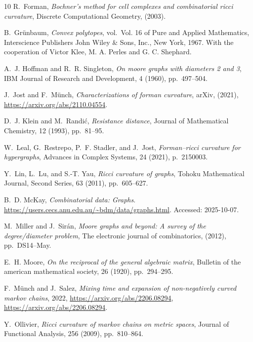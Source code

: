 \documentclass[11pt,a4paper]{amsart}
\begin{document}
\begin{thebibliography}{10}
{\sc R.~Forman}, {\em Bochner's method for cell complexes and combinatorial ricci curvature}, Discrete Computational Geometry,  (2003).

{\sc B.~Gr\"unbaum}, {\em Convex polytopes}, vol.~Vol. 16 of Pure and Applied Mathematics, Interscience Publishers John Wiley \& Sons, Inc., New York, 1967.
\newblock With the cooperation of Victor Klee, M. A. Perles and G. C. Shephard.

{\sc A.~J. Hoffman and R.~R. Singleton}, {\em On moore graphs with diameters 2 and 3}, IBM Journal of Research and Development, 4 (1960), pp.~497--504.

{\sc J.~Jost and F.~M{\"u}nch}, {\em Characterizations of forman curvature}, arXiv,  (2021), \url{https://arxiv.org/abs/2110.04554}.

{\sc D.~J. Klein and M.~Randi{\'c}}, {\em Resistance distance}, Journal of Mathematical Chemistry, 12 (1993), pp.~81--95.

{\sc W.~Leal, G.~Restrepo, P.~F. Stadler, and J.~Jost}, {\em Forman--ricci curvature for hypergraphs}, Advances in Complex Systems, 24 (2021), p.~2150003.

{\sc Y.~Lin, L.~Lu, and S.-T. Yau}, {\em Ricci curvature of graphs}, Tohoku Mathematical Journal, Second Series, 63 (2011), pp.~605--627.

{\sc B.~D. McKay}, {\em Combinatorial data: Graphs}.
\newblock \url{https://users.cecs.anu.edu.au/~bdm/data/graphs.html}.
\newblock Accessed: 2025-10-07.

{\sc M.~Miller and J.~Sir{\'a}n}, {\em Moore graphs and beyond: A survey of the degree/diameter problem}, The electronic journal of combinatorics,  (2012), pp.~DS14--May.

{\sc E.~H. Moore}, {\em On the reciprocal of the general algebraic matrix}, Bulletin of the american mathematical society, 26 (1920), pp.~294--295.

{\sc F.~Münch and J.~Salez}, {\em Mixing time and expansion of non-negatively curved markov chains}, 2022, \url{https://arxiv.org/abs/2206.08294}, \url{https://arxiv.org/abs/2206.08294}.

{\sc Y.~Ollivier}, {\em Ricci curvature of markov chains on metric spaces}, Journal of Functional Analysis, 256 (2009), pp.~810--864.


\end{thebibliography}
\end{document}
